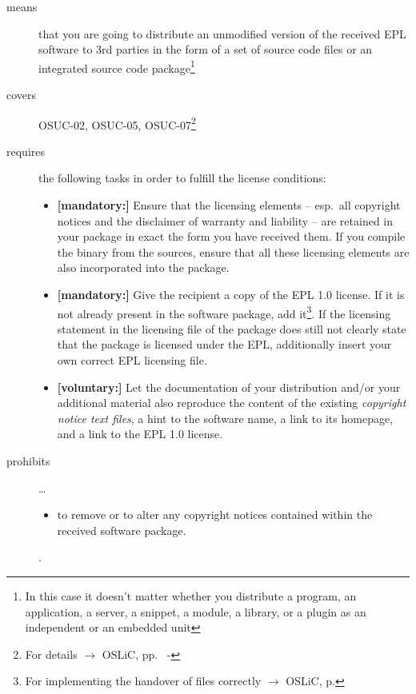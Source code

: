 \begin{description}

\item[means] that you are going to distribute an unmodified version of the
received EPL software to 3rd parties in the form of a set of source code files or
an integrated source code package\footnote{In this case it doesn't matter
whether you  distribute a program, an application, a server, a snippet, a
module, a library, or a plugin as an independent or an embedded unit}

\item[covers] OSUC-02, OSUC-05, OSUC-07\footnote{For details $\rightarrow$ OSLiC, pp.\ 
\pageref{OSUC-02-DEF} - \pageref{OSUC-07-DEF}}

\item[requires] the following tasks in order to fulfill the license conditions:
\begin{itemize}
  
  \item \textbf{[mandatory:]} Ensure that the licensing elements -- esp.\ all
  copyright notices and the disclaimer of warranty and liability -- are retained
  in your package in exact the form you have received them. If you compile the
  binary from the sources, ensure that all these licensing elements are also
  incorporated into the package. 
  
  \item \textbf{[mandatory:]} Give the recipient a copy of the EPL 1.0 license.
  If it is not already present in the software package, add it\footnote{For
  implementing the handover of files correctly $\rightarrow$ OSLiC, p.
  \pageref{DistributingFilesHint}}. If the licensing statement in the licensing
  file of the package does still not clearly state that the package is licensed
  under the EPL, additionally insert your own correct EPL licensing file.
  
  \item \textbf{[voluntary:]} Let the documentation of your distribution and/or
  your additional material also reproduce the content of the existing
  \emph{copyright notice text files}, a hint to the software name, a link to its
  homepage, and a link to the EPL 1.0 license.
\end{itemize}

\item[prohibits] \ldots
\begin{itemize}
  \item to remove or to alter any copyright notices contained within the
  received software package.
\end{itemize}.

\end{description}


